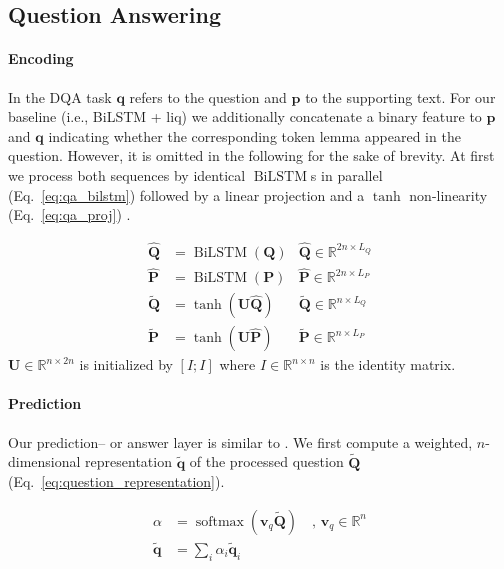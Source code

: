 \documentclass[11pt,a4paper]{article}
\begin{document}
\subsection{Question Answering}\label{sec:qa_impl}

\paragraph{Encoding} In the DQA task $\boldsymbol{q}$ refers to the question and $\boldsymbol{p}$ to the supporting text. For our baseline (i.e., BiLSTM + liq) we additionally concatenate a binary feature to $\boldsymbol{p}$ and $\boldsymbol{q}$ indicating whether the corresponding token lemma appeared in the question. However, it is omitted in the following for the sake of brevity. At first we process both sequences by identical $\operatorname{BiLSTM}$s in parallel (Eq.~\ref{eq:qa_bilstm}) followed by a linear projection and a $\tanh$ non-linearity (Eq.~\ref{eq:qa_proj}) .

\begin{align}
    \hat{\mathbf{Q}} &= \operatorname{BiLSTM} \left( \mathbf{Q}\right)
    & \hat{\mathbf{Q}} \in \mathbb{R}^{2n \times L_Q} \nonumber\\
    \hat{\mathbf{P}} &= \operatorname{BiLSTM} \left( \mathbf{P}\right) 
    & \hat{\mathbf{P}} \in \mathbb{R}^{2n \times L_P} \label{eq:qa_bilstm} \\
    \tilde{\mathbf{Q}} &= \tanh \left( \mathbf{U} \hat{\mathbf{Q}} \right)
    & \tilde{\mathbf{Q}} \in \mathbb{R}^{n \times L_Q} \nonumber \\
    \tilde{\mathbf{P}} &= \tanh \left( \mathbf{U} \hat{\mathbf{P}} \right)
    & \tilde{\mathbf{P}} \in \mathbb{R}^{n \times L_P} \label{eq:qa_proj} 
\end{align}
\noindent
$\mathbf{U} \in \mathbb{R}^{n\times 2n}$ is initialized by $[I;I]$ where $I \in \mathbb{R}^{n\times n}$ is the identity matrix.

\paragraph{Prediction} Our prediction-- or answer layer is similar to . We first compute a weighted, $n$-dimensional representation $\tilde{\boldsymbol{q}}$ of the processed question $\tilde{\mathbf{Q}}$ (Eq.~\ref{eq:question_representation}).

\begin{align}
    \alpha &= \operatorname{softmax}(\mathbf{v}_q \tilde{\mathbf{Q}}) \quad , \, \mathbf{v}_q \in \mathbb{R}^n \nonumber \\
    \tilde{\mathbf{q}} &= \sum_i \alpha_i \tilde{\mathbf{q}}_i \label{eq:question_representation}
\end{align}
\end{document}

